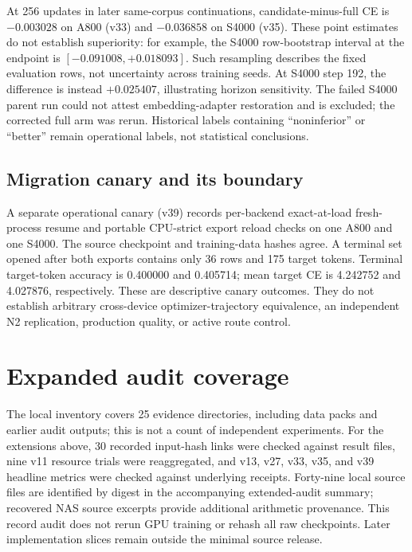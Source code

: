 \documentclass[10pt]{article}
\begin{document}
At 256 updates in later same-corpus continuations, candidate-minus-full CE is $-0.003028$ on A800 (v33) and $-0.036858$ on S4000 (v35). These point estimates do not establish superiority: for example, the S4000 row-bootstrap interval at the endpoint is $[-0.091008,+0.018093]$. Such resampling describes the fixed evaluation rows, not uncertainty across training seeds. At S4000 step 192, the difference is instead $+0.025407$, illustrating horizon sensitivity. The failed S4000 parent run could not attest embedding-adapter restoration and is excluded; the corrected full arm was rerun. Historical labels containing ``noninferior'' or ``better'' remain operational labels, not statistical conclusions.

\subsection{Migration canary and its boundary}
A separate operational canary (v39) records per-backend exact-at-load fresh-process resume and portable CPU-strict export reload checks on one A800 and one S4000. The source checkpoint and training-data hashes agree. A terminal set opened after both exports contains only 36 rows and 175 target tokens. Terminal target-token accuracy is 0.400000 and 0.405714; mean target CE is 4.242752 and 4.027876, respectively. These are descriptive canary outcomes. They do not establish arbitrary cross-device optimizer-trajectory equivalence, an independent N2 replication, production quality, or active route control.

\section{Expanded audit coverage}
The local inventory covers 25 evidence directories, including data packs and earlier audit outputs; this is not a count of independent experiments. For the extensions above, 30 recorded input-hash links were checked against result files, nine v11 resource trials were reaggregated, and v13, v27, v33, v35, and v39 headline metrics were checked against underlying receipts. Forty-nine local source files are identified by digest in the accompanying extended-audit summary; recovered NAS source excerpts provide additional arithmetic provenance. This record audit does not rerun GPU training or rehash all raw checkpoints. Later implementation slices remain outside the minimal source release.

\clearpage


\end{document}
